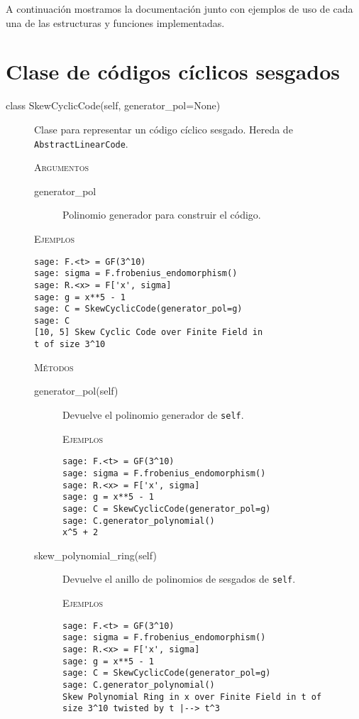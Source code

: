 A continuación mostramos la documentación junto con ejemplos de uso de cada una de las estructuras y funciones implementadas.

\newpage
\section{Clase de códigos cíclicos sesgados}%
\label{sec:clase_de_códigos_cíclicos_sesgados}

\begin{description}
    \item[class SkewCyclicCode(self, generator\_pol=None)]
    Clase para representar un código cíclico sesgado. Hereda de \texttt{AbstractLinearCode}.

    \textsc{Argumentos}
    \begin{description}
        \item[generator\_pol] Polinomio generador para construir el código.
    \end{description}

    \textsc{Ejemplos}
    \begin{lstlisting}
sage: F.<t> = GF(3^10)
sage: sigma = F.frobenius_endomorphism()
sage: R.<x> = F['x', sigma]
sage: g = x**5 - 1
sage: C = SkewCyclicCode(generator_pol=g)
sage: C
[10, 5] Skew Cyclic Code over Finite Field in
t of size 3^10
    \end{lstlisting}

    \textsc{Métodos}
    \begin{description}
    \item[generator\_pol(self)]
    Devuelve el polinomio generador de \texttt{self}.

    \textsc{Ejemplos}
    \begin{lstlisting}
sage: F.<t> = GF(3^10)
sage: sigma = F.frobenius_endomorphism()
sage: R.<x> = F['x', sigma]
sage: g = x**5 - 1
sage: C = SkewCyclicCode(generator_pol=g)
sage: C.generator_polynomial()
x^5 + 2
    \end{lstlisting}

    \end{description}

    \begin{description}
    \item[skew\_polynomial\_ring(self)]
    Devuelve el anillo de polinomios de sesgados de \texttt{self}.

    \textsc{Ejemplos}
    \begin{lstlisting}
sage: F.<t> = GF(3^10)
sage: sigma = F.frobenius_endomorphism()
sage: R.<x> = F['x', sigma]
sage: g = x**5 - 1
sage: C = SkewCyclicCode(generator_pol=g)
sage: C.generator_polynomial()
Skew Polynomial Ring in x over Finite Field in t of
size 3^10 twisted by t |--> t^3
    \end{lstlisting}

    \end{description}

\end{description}

